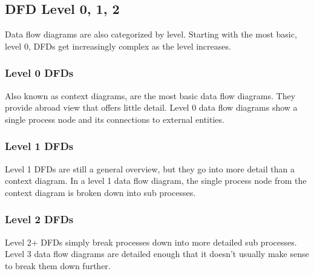 \documentclass[11pt]{article}
\begin{document}
\subsection{DFD Level 0, 1, 2}

Data flow diagrams are also categorized by level. Starting with the most basic, level 0, DFDs get
increasingly complex as the level increases.

\subsubsection{Level 0 DFDs}
Also known as context diagrams, are the most basic data flow diagrams. They provide abroad view that offers little detail. Level 0 data flow diagrams show a single process node and its
connections to external entities.

\subsubsection{Level 1 DFDs}
Level 1 DFDs are still a general overview, but they go into more detail than a context diagram. In a level
1 data flow diagram, the single process node from the context diagram is broken down into sub
processes.

\subsubsection{Level 2 DFDs}
Level 2+ DFDs simply break processes down into more detailed sub processes. Level 3 data flow
diagrams are detailed enough that it doesn't usually make sense to break them down further.
\end{document}
